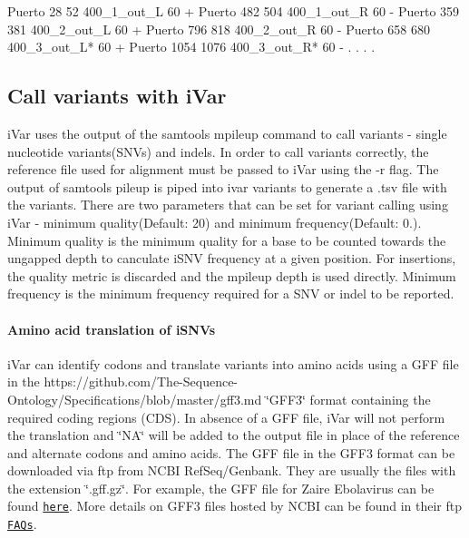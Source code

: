 \begin{DoxyCode}
Puerto  28  52  400\_1\_out\_L 60  +
Puerto  482 504 400\_1\_out\_R 60  -
Puerto  359 381 400\_2\_out\_L 60  +
Puerto  796 818 400\_2\_out\_R 60  -
Puerto  658 680 400\_3\_out\_L*    60  +
Puerto  1054    1076    400\_3\_out\_R*    60  -
.
.
.
.
\end{DoxyCode}
\hypertarget{manualpage_autotoc_md17}{}\subsection{Call variants with i\+Var}\label{manualpage_autotoc_md17}
i\+Var uses the output of the {\ttfamily samtools mpileup} command to call variants -\/ single nucleotide variants(\+S\+N\+Vs) and indels. In order to call variants correctly, the reference file used for alignment must be passed to i\+Var using the {\ttfamily -\/r} flag. The output of {\ttfamily samtools pileup} is piped into {\ttfamily ivar variants} to generate a .tsv file with the variants. There are two parameters that can be set for variant calling using i\+Var -\/ minimum quality(\+Default\+: 20) and minimum frequency(Default\+: 0.). Minimum quality is the minimum quality for a base to be counted towards the ungapped depth to canculate i\+S\+NV frequency at a given position. For insertions, the quality metric is discarded and the mpileup depth is used directly. Minimum frequency is the minimum frequency required for a S\+NV or indel to be reported.

\paragraph*{Amino acid translation of i\+S\+N\+Vs}

i\+Var can identify codons and translate variants into amino acids using a G\+FF file in the https\+://github.com/\+The-\/\+Sequence-\/\+Ontology/\+Specifications/blob/master/gff3.\+md \char`\"{}\+G\+F\+F3\char`\"{} format containing the required coding regions (C\+DS). In absence of a G\+FF file, i\+Var will not perform the translation and \char`\"{}\+N\+A\char`\"{} will be added to the output file in place of the reference and alternate codons and amino acids. The G\+FF file in the G\+F\+F3 format can be downloaded via ftp from N\+C\+BI Ref\+Seq/\+Genbank. They are usually the files with the extension \char`\"{}.\+gff.\+gz\char`\"{}. For example, the G\+FF file for Zaire Ebolavirus can be found \href{ftp://ftp.ncbi.nlm.nih.gov/genomes/refseq/viral/Zaire_ebolavirus/all_assembly_versions/GCF_000848505.1_ViralProj14703}{\tt here}. More details on G\+F\+F3 files hosted by N\+C\+BI can be found in their ftp \href{https://www.ncbi.nlm.nih.gov/genome/doc/ftpfaq/}{\tt F\+A\+Qs}.

